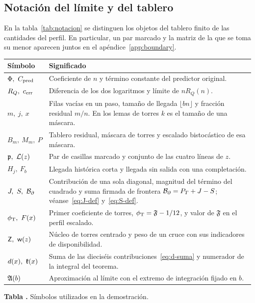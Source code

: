 \subsection{Notación del límite y del tablero}\label{sec:notacion}
En la tabla~\ref{tab:notacion} se distinguen los objetos del tablero finito de las cantidades
del perfil. En particular, un par marcado y la matriz de la que se toma su menor aparecen
juntos en el apéndice~\ref{app:boundary}.
\begin{center}
\small
\begin{tabular}{@{}L{.21\linewidth}L{.72\linewidth}@{}}
\toprule Símbolo & Significado\\ \midrule
\(\Phi,\ C_{\rm pred}\) & Coeficiente de \(n\) y término constante del predictor original.\\
\(R_Q,\ c_{\mathrm{err}}\) & Diferencia de los dos logaritmos y límite de \(nR_Q(n)\).\\
\(m,\ j,\ x\) & Filas vacías en un paso, tamaño de llegada \(\lfloor bn\rfloor\) y
 fracción residual \(m/n\). En los lemas de torres \(k\) es el tamaño de una máscara.\\
\(B_m,\ M_m,\ P\) & Tablero residual, máscara de torres y escalado bistocástico de esa máscara.\\
\(\mathfrak p,\ \mathcal L(z)\) & Par de casillas marcado y conjunto de las cuatro líneas de \(z\).\\
\(H_j,\ F_b\) & Llegada histórica corta y llegada sin salida con una completación.\\
\(J,\ S,\ \mathcal B_{\partial}\) & Contribución de una sola diagonal, magnitud del término del
 cuadrado y suma firmada de frontera \(\mathcal B_{\partial}=P_T+J-S\); véanse~\eqref{eq:J-def}
 y~\eqref{eq:S-def}.\\
\(\phi_{\mathrm T},\ F(x)\) & Primer coeficiente de torres, \(\phi_{\mathrm T}=\mathfrak F-1/12\),
 y valor de \(\mathfrak F\) en el perfil escalado.\\
\(\mathsf Z,\ \mathsf w(z)\) & Núcleo de torres centrado y peso de un cruce con sus indicadores
 de disponibilidad.\\
\(d(x),\ \mathfrak{k}(x)\) & Suma de las dieciséis contribuciones~\eqref{eq:d-suma} y numerador de
 la integral del teorema.\\
\(\mathfrak A(b)\) & Aproximación al límite con el extremo de integración fijado en \(b\).\\
\bottomrule
\end{tabular}
\label{tab:notacion}\par\smallskip
\textbf{Tabla \thetable.} Símbolos utilizados en la demostración.
\end{center}
